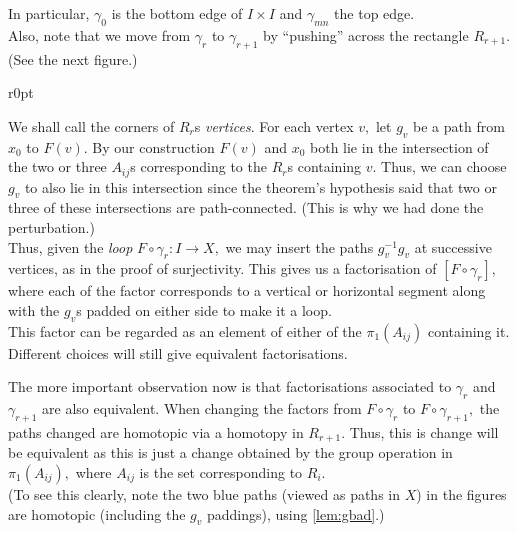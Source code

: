 \documentclass[12pt]{article}
\begin{document}
	In particular, $\gamma_0$ is the bottom edge of $I\times I$ and $\gamma_{mn}$ the top edge.\\
	Also, note that we move from $\gamma_r$ to $\gamma_{r+1}$ by ``pushing'' across the rectangle $R_{r+1}.$ (See the next figure.)

	\begin{wrapfigure}{r}{0pt}
		
	\end{wrapfigure}

	We shall call the corners of $R_r$s \emph{vertices}. For each vertex $v,$ let $g_v$ be a path from $x_0$ to $F(v).$ By our construction $F(v)$ and $x_0$ both lie in the intersection of the two or three $A_{ij}$s corresponding to the $R_r$s containing $v.$ Thus, we can choose $g_v$ to also lie in this intersection since the theorem's hypothesis said that two or three of these intersections are path-connected. (This is why we had done the perturbation.)\\
	Thus, given the \emph{loop} $F\circ\gamma_r:I \to X,$ we may insert the paths $g_v^{-1}g_v$ at successive vertices, as in the proof of surjectivity. This gives us a factorisation of $[F\circ\gamma_r],$ where each of the factor corresponds to a vertical or horizontal segment along with the $g_v$s padded on either side to make it a loop.\\
	This factor can be regarded as an element of either of the $\pi_1(A_{ij})$ containing it. Different choices will still give equivalent factorisations.

	The more important observation now is that factorisations associated to $\gamma_r$ and $\gamma_{r+1}$ are also equivalent. When changing the factors from $F\circ\gamma_r$ to $F\circ\gamma_{r+1},$ the paths changed are homotopic via a homotopy in $R_{r+1}.$ Thus, this is change will be equivalent as this is just a change obtained by the group operation in $\pi_1(A_{ij}),$ where $A_{ij}$ is the set corresponding to $R_i.$ \\
	(To see this clearly, note the two blue paths (viewed as paths in $X$) in the figures are homotopic (including the $g_v$ paddings), using \cref{lem:gbad}.)
\end{document}
